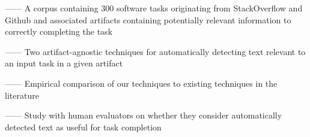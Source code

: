 ------ A corpus containing 300 software tasks originating from StackOverflow and Github and associated artifacts containing potentially relevant information to correctly completing the task \vspace{3mm}

------ Two artifact-agnostic techniques for automatically detecting text relevant to an input task in a given artifact

------ Empirical comparison of our techniques to existing techniques in the literature

------ Study with human evaluators on whether they consider automatically detected text as useful for task completion

